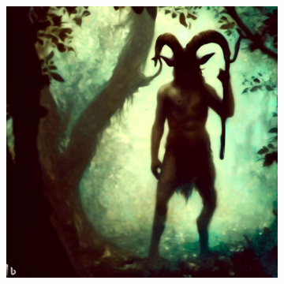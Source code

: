 \documentclass[11pt, twoside]{article}
\begin{document}
\begin{figure}[H]
\begin{subfigure}{0.3\textwidth}
  \end{subfigure}%
  \begin{subfigure}{0.3\textwidth}
    \centering
    \includegraphics[width=0.99\linewidth]{faun3.jpeg}
  \end{subfigure}%
\end{figure}
\end{document}
